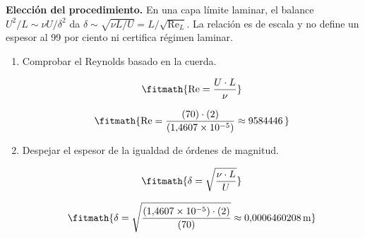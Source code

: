 \noindent\textbf{Elección del procedimiento.} En una capa límite laminar, el balance $U^2/L\sim\nu U/\delta^2$ da $\delta\sim\sqrt{\nu L/U}=L/\sqrt{\mathrm{Re}_L}$. La relación es de escala y no define un espesor al 99 por ciento ni certifica régimen laminar.

\begin{enumerate}

\item Comprobar el Reynolds basado en la cuerda.

\[\fitmath{\mathrm{Re}=\frac{U\cdot L}{\nu}}\]

\[\fitmath{\mathrm{Re}=\frac{(70)\cdot (2)}{(1{,}4607\times10^{-5})}\approx 9584446\,}\]

\item Despejar el espesor de la igualdad de órdenes de magnitud.

\[\fitmath{\delta=\sqrt{\frac{\nu\cdot L}{U}}}\]

\[\fitmath{\delta=\sqrt{\frac{(1{,}4607\times10^{-5})\cdot (2)}{(70)}}\approx 0{,}0006460208\,\mathrm{m}}\]

\end{enumerate}
